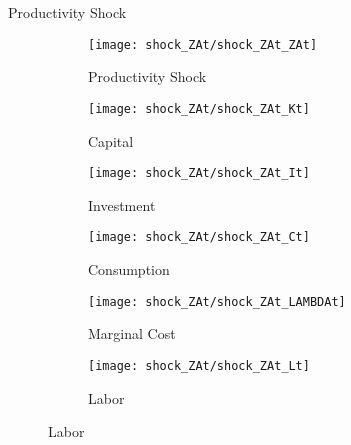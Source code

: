 \documentclass[
presentation.tex
]{subfiles}
\begin{document}
\begin{frame}{Productivity Shock}
	
	\begin{figure}[h!]
		\centering
		\begin{subfigure}[b]{0.3\textwidth}
			\centering
			\texttt{[image: shock\_ZAt/shock\_ZAt\_ZAt]}
			\caption{Productivity Shock}
			\label{fig:zat-productivity-shock}
		\end{subfigure}
		\hfill
		\begin{subfigure}[b]{0.3\textwidth}
			\centering
			\texttt{[image: shock\_ZAt/shock\_ZAt\_Kt]}
			\caption{Capital}
			\label{fig:zat-capital}
		\end{subfigure}
		\hfill
		\begin{subfigure}[b]{0.3\textwidth}
			\centering
			\texttt{[image: shock\_ZAt/shock\_ZAt\_It]}
			\caption{Investment}
			\label{fig:zat-investment}
		\end{subfigure}
		\hfill
		
		\vspace*{0.5cm}
		
		\begin{subfigure}[b]{0.3\textwidth}
			\centering
			\texttt{[image: shock\_ZAt/shock\_ZAt\_Ct]}
			\caption{Consumption}
			\label{fig:zat-consumption}
		\end{subfigure}
		\hfill
		\begin{subfigure}[b]{0.3\textwidth}
			\centering
			\texttt{[image: shock\_ZAt/shock\_ZAt\_LAMBDAt]}
			\caption{Marginal Cost}
			\label{fig:zat-marginal-cost}
		\end{subfigure}
		\hfill
		\begin{subfigure}[b]{0.3\textwidth}
			\centering
			\texttt{[image: shock\_ZAt/shock\_ZAt\_Lt]}
			\caption{Labor}
			\label{fig:zat-labor}
		\end{subfigure}
		\hfill		
	\end{figure}
	
\end{frame}

\end{document}
